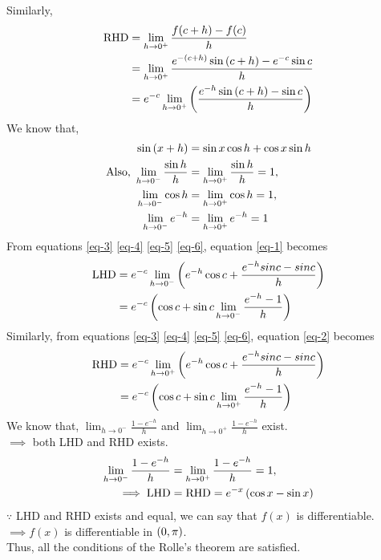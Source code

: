 \documentclass[journal,12pt,twocolumn]{IEEEtran}
\begin{document}
Similarly,
\begin{align}
    \text{RHD} &= \lim_{h \to 0^{+}} \frac{f(c+h)-f(c)}{h}\\
    &= \lim_{h \to 0^{+}} \frac{e^{-\left(c+h\right)} \sin \left(c+h\right) - e^{-c} \sin c}{h}\\
    \label{eq-2}
    &= e^{-c} \lim_{h \to 0^{+}} \left(\frac{e^{-h} \sin \left(c+h\right) - \sin c}{h}\right)
\end{align}
We know that,
\begin{align}
    \label{eq-3}
    \sin \left(x+h\right) &= \sin x \cos h + \cos x \sin h\\
    \label{eq-4}
    \text{Also, } \lim_{h \to 0^{-}} \frac{\sin h}{h} &= \lim_{h \to 0^{+}} \frac{\sin h}{h} = 1,\\
    \label{eq-5}
    \lim_{h \to 0^{-}} \cos h &= \lim_{h \to 0^{+}} \cos h = 1,\\
    \label{eq-6}
    \lim_{h \to 0^{-}} e^{-h} &= \lim_{h \to 0^{+}} e^{-h} = 1
\end{align}
From equations \eqref{eq-3} \eqref{eq-4} \eqref{eq-5} \eqref{eq-6}, equation \eqref{eq-1} becomes
\begin{align}
    \text{LHD} &= e^{-c} \lim_{h \to 0^{-}} \left(e^{-h} \cos c +\frac{e^{-h}sinc - sinc}{h}\right)\\
    &= e^{-c} \left(\cos c + \sin c \lim_{h \to 0^{-}} \frac{e^{-h}-1}{h}\right)
\end{align}
Similarly, from equations \eqref{eq-3} \eqref{eq-4} \eqref{eq-5} \eqref{eq-6}, equation \eqref{eq-2} becomes
\begin{align}
    \text{RHD} &= e^{-c} \lim_{h \to 0^{+}} \left(e^{-h} \cos c +\frac{e^{-h}sinc - sinc}{h}\right)\\
    &= e^{-c} \left(\cos c + \sin c \lim_{h \to 0^{+}} \frac{e^{-h}-1}{h}\right)
\end{align}
We know that, $\lim_{h \to 0^{-}} \frac{1-e^{-h}}{h}$ and $\lim_{h \to 0^{+}} \frac{1-e^{-h}}{h}$ exist.\\
$\implies$ both LHD and RHD exists.
\begin{align}
    \lim_{h \to 0^{-}} \frac{1-e^{-h}}{h} &= \lim_{h \to 0^{+}} \frac{1-e^{-h}}{h} = 1,\\
    \implies \text{LHD} &= \text{RHD} = e^{-x} \left(\cos x - \sin x\right)
\end{align}
$\because$ LHD and RHD exists and equal, we can say that $f(x)$ is differentiable.\\
$\implies f(x)$ is differentiable in $\left(0,\pi\right)$.\\
Thus, all the conditions of the Rolle's theorem are satisfied.\\
\end{document}
